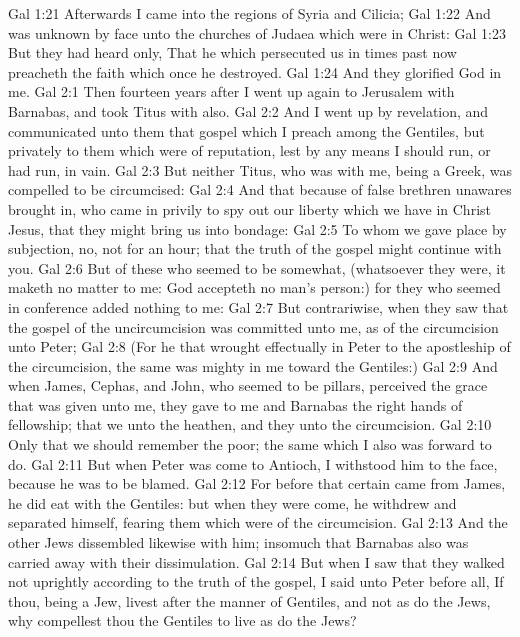 \vs Gal 1:21 Afterwards I came into the regions of Syria and Cilicia;
\vs Gal 1:22 And was unknown by face unto the churches of Judaea which were in Christ:
\vs Gal 1:23 But they had heard only, That he which persecuted us in times past now preacheth the faith which once he destroyed.
\vs Gal 1:24 And they glorified God in me.
\vs Gal 2:1 Then fourteen years after I went up again to Jerusalem with Barnabas, and took Titus with  also.
\vs Gal 2:2 And I went up by revelation, and communicated unto them that gospel which I preach among the Gentiles, but privately to them which were of reputation, lest by any means I should run, or had run, in vain.
\vs Gal 2:3 But neither Titus, who was with me, being a Greek, was compelled to be circumcised:
\vs Gal 2:4 And that because of false brethren unawares brought in, who came in privily to spy out our liberty which we have in Christ Jesus, that they might bring us into bondage:
\vs Gal 2:5 To whom we gave place by subjection, no, not for an hour; that the truth of the gospel might continue with you.
\vs Gal 2:6 But of these who seemed to be somewhat, (whatsoever they were, it maketh no matter to me: God accepteth no man's person:) for they who seemed  in conference added nothing to me:
\vs Gal 2:7 But contrariwise, when they saw that the gospel of the uncircumcision was committed unto me, as  of the circumcision  unto Peter;
\vs Gal 2:8 (For he that wrought effectually in Peter to the apostleship of the circumcision, the same was mighty in me toward the Gentiles:)
\vs Gal 2:9 And when James, Cephas, and John, who seemed to be pillars, perceived the grace that was given unto me, they gave to me and Barnabas the right hands of fellowship; that we  unto the heathen, and they unto the circumcision.
\vs Gal 2:10 Only  that we should remember the poor; the same which I also was forward to do.
\vs Gal 2:11 But when Peter was come to Antioch, I withstood him to the face, because he was to be blamed.
\vs Gal 2:12 For before that certain came from James, he did eat with the Gentiles: but when they were come, he withdrew and separated himself, fearing them which were of the circumcision.
\vs Gal 2:13 And the other Jews dissembled likewise with him; insomuch that Barnabas also was carried away with their dissimulation.
\vs Gal 2:14 But when I saw that they walked not uprightly according to the truth of the gospel, I said unto Peter before  all, If thou, being a Jew, livest after the manner of Gentiles, and not as do the Jews, why compellest thou the Gentiles to live as do the Jews?
